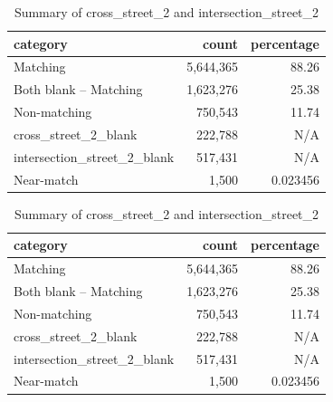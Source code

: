 \documentclass[12pt, titlepage]{article}
\begin{document}
\begin{table}[H]
    \centering
    \footnotesize
    \begin{tabular}{l r r}
        \toprule
        \textbf{category} & \textbf{count} & \textbf{percentage} \\
        \midrule
        Matching                    & 5,644,365 & 88.26     \\
        Both blank -- Matching      & 1,623,276 & 25.38     \\
        Non-matching                &   750,543 & 11.74     \\
        cross\_street\_2\_blank     &   222,788 & N/A       \\
        intersection\_street\_2\_blank &   517,431 & N/A       \\
        Near-match                  &     1,500 & 0.023456  \\
        \bottomrule
    \end{tabular}
    \caption{Summary of cross\_street\_2 and intersection\_street\_2}
    \label{tab:summary_cross_intersection_2}
\end{table}



\begin{table}[H]
    \centering
    \footnotesize
    \begin{tabular}{l r r}
        \toprule
        \textbf{category} & \textbf{count} & \textbf{percentage} \\
        \midrule
        Matching                    & 5,644,365 & 88.26     \\
        Both blank -- Matching      & 1,623,276 & 25.38     \\
        Non-matching                &   750,543 & 11.74     \\
        cross\_street\_2\_blank     &   222,788 & N/A       \\
        intersection\_street\_2\_blank &   517,431 & N/A       \\
        Near-match                  &     1,500 & 0.023456  \\
        \bottomrule
    \end{tabular}
    \caption{Summary of cross\_street\_2 and intersection\_street\_2}
    \label{tab:summary_cross_intersection_2}
\end{table}
\end{document}
